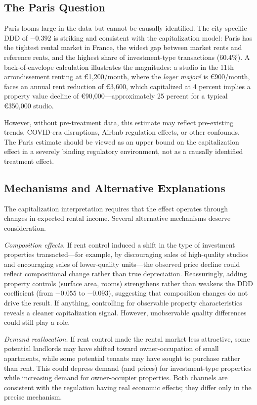 \documentclass[12pt]{article}
\begin{document}
\subsection{The Paris Question}

Paris looms large in the data but cannot be causally identified. The city-specific DDD of $-0.392$ is striking and consistent with the capitalization model: Paris has the tightest rental market in France, the widest gap between market rents and reference rents, and the highest share of investment-type transactions (60.4\%). A back-of-envelope calculation illustrates the magnitudes: a studio in the 11th arrondissement renting at \euro{1,200}/month, where the \emph{loyer major\'e} is \euro{900}/month, faces an annual rent reduction of \euro{3,600}, which capitalized at 4 percent implies a property value decline of \euro{90,000}---approximately 25 percent for a typical \euro{350,000} studio.

However, without pre-treatment data, this estimate may reflect pre-existing trends, COVID-era disruptions, Airbnb regulation effects, or other confounds. The Paris estimate should be viewed as an upper bound on the capitalization effect in a severely binding regulatory environment, not as a causally identified treatment effect.

\subsection{Mechanisms and Alternative Explanations}

The capitalization interpretation requires that the effect operates through changes in expected rental income. Several alternative mechanisms deserve consideration.

\emph{Composition effects.} If rent control induced a shift in the type of investment properties transacted---for example, by discouraging sales of high-quality studios and encouraging sales of lower-quality units---the observed price decline could reflect compositional change rather than true depreciation. Reassuringly, adding property controls (surface area, rooms) strengthens rather than weakens the DDD coefficient (from $-0.055$ to $-0.093$), suggesting that composition changes do not drive the result. If anything, controlling for observable property characteristics reveals a cleaner capitalization signal. However, unobservable quality differences could still play a role.

\emph{Demand reallocation.} If rent control made the rental market less attractive, some potential landlords may have shifted toward owner-occupation of small apartments, while some potential tenants may have sought to purchase rather than rent. This could depress demand (and prices) for investment-type properties while increasing demand for owner-occupier properties. Both channels are consistent with the regulation having real economic effects; they differ only in the precise mechanism.
\end{document}
